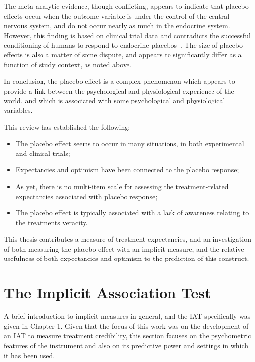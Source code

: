 The meta-analytic evidence, though conflicting, appears to indicate that placebo effects occur when the outcome variable is under the control of the central nervous system, and do not occur nearly as much in the endocrine system. However, this finding is based on clinical trial data and contradicts the successful conditioning of humans to respond to endocrine placebos~\cite{benedetti2003a}. The size of placebo effects is also a matter of some dispute, and appears to significantly differ as a function of study context, as noted above. 

In conclusion, the placebo effect is a complex phenomenon which appears to provide a link between the psychological and physiological  experience of the world, and which is associated  with some psychological and physiological variables. 

This review has established the following:

\begin{itemize}
\item The placebo effect seems to occur in many situations, in both experimental and clinical trials;
\item Expectancies and optimism have been connected to the placebo response;
\item As yet, there is no multi-item scale for assessing the treatment-related expectancies associated with placebo response;
\item The placebo effect is typically associated with a lack of awareness relating to the treatments veracity.
\end{itemize}

This thesis contributes a measure of treatment expectancies, and an investigation of both measuring the placebo effect with an implicit measure, and the relative usefulness of both expectancies and optimism to the prediction of this construct. 

\section{The Implicit Association Test}
\label{sec:impl-assoc-test}

A brief introduction to implicit measures in general, and the IAT specifically was given in Chapter 1. Given that the focus of this work was on the development of an IAT to measure treatment credibility, this section focuses on the psychometric features of the instrument and also on its predictive power and settings in which it has been used. 


